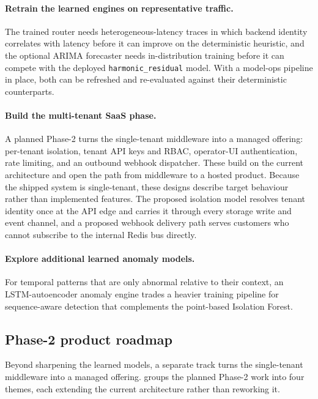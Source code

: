 \paragraph{Retrain the learned engines on representative traffic.} The trained router
needs heterogeneous-latency traces in which backend identity correlates with latency
before it can improve on the deterministic heuristic, and the optional ARIMA forecaster
needs in-distribution training before it can compete with the deployed
\texttt{harmonic\_residual} model. With a model-ops pipeline in place, both can be
refreshed and re-evaluated against their deterministic counterparts.

\paragraph{Build the multi-tenant SaaS phase.} A planned Phase-2 turns the single-tenant
middleware into a managed offering: per-tenant isolation, tenant API keys and RBAC,
operator-UI authentication, rate limiting, and an outbound webhook dispatcher. These
build on the current architecture and open the path from middleware to a hosted product.
Because the shipped system is single-tenant, these designs describe target behaviour
rather than implemented features. The proposed isolation model resolves tenant identity
once at the API edge and carries it through every storage write and event channel, and a
proposed webhook delivery path serves customers who cannot subscribe to the internal
Redis bus directly.

\paragraph{Explore additional learned anomaly models.} For temporal patterns that are
only abnormal relative to their context, an LSTM-autoencoder anomaly engine
\cite{su2019omnianomaly} trades a heavier training pipeline for sequence-aware detection
that complements the point-based Isolation Forest.

\subsection{Phase-2 product roadmap}
\label{conc:roadmap}

Beyond sharpening the learned models, a separate track turns the single-tenant
middleware into a managed offering.  groups the planned Phase-2
work into four themes, each extending the current architecture rather than reworking it.

